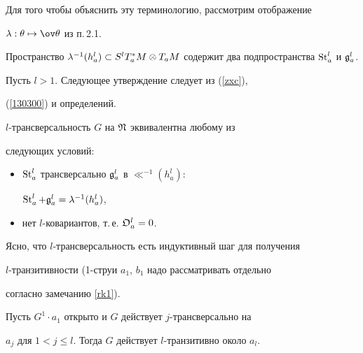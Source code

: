 Для того чтобы объяснить эту терминологию, рассмотрим отображение


$\ll:\te\mapsto\ov\te$ из п.\,2.1.


Пространство $\ll^{-1}(h^l_a)\subset S^lT^*_aM\ot


T_aM$ содержит два подпространства $\St$ и $\frak{g}^l_a$.





Пусть $l>1$. Следующее утверждение следует из (\ref{zxc}),


(\ref{130300}) и определений.





\begin{prop}\label{thm4}


$l$-трансверсальность $G$ на $\frak{N}$ эквивалентна любому из


следующих условий\/${:}$


\begin{itemize}


\item[---] $\mathop{\mathrm{St}}\nolimits^l_a$ трансверсально $\frak{g}_a^l$ в $\ll^{-1}(h_a^l){:}$


$\mathop{\mathrm{St}}\nolimits^l_a+\frak{g}_a^l=\lambda^{-1}(h_a^l)$,


\item[---] нет $l$-ковариантов, т.\,е. $\frak{O}_a^l=0$.


\end{itemize}


\end{prop}





Ясно, что $l$-трансверсальность есть индуктивный шаг для получения


$l$-транзитивности (1-струи $a_1$, $b_1$ надо рассматривать отдельно


согласно замечанию \ref{rk1}).





\begin{thm}


Пусть $G^1\cdot a_1$ открыто и $G$ действует $j$-трансверсально на


$a_j$ для $1<j\le l$. Тогда $G$ действует $l$-транзитивно около $a_l$.


\end{thm}








